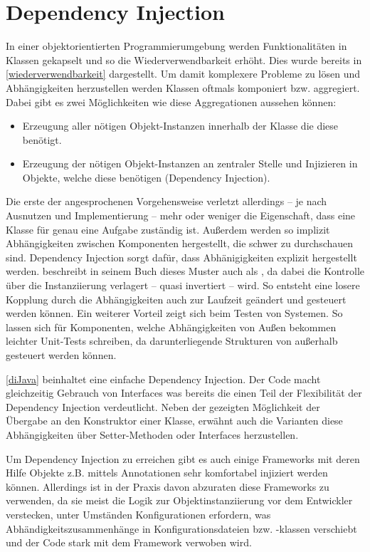 \section{Dependency Injection}
In einer objektorientierten Programmierumgebung werden Funktionalitäten in Klassen gekapselt und so die Wiederverwendbarkeit erhöht. Dies wurde bereits in \autoref{wiederverwendbarkeit} dargestellt. Um damit komplexere Probleme zu lösen und Abhängigkeiten herzustellen werden Klassen oftmals komponiert bzw. aggregiert. Dabei gibt es zwei Möglichkeiten wie diese Aggregationen aussehen können:

\begin{itemize}
    \item Erzeugung aller nötigen Objekt-Instanzen innerhalb der Klasse die diese benötigt.
    \item Erzeugung der nötigen Objekt-Instanzen an zentraler Stelle und Injizieren in Objekte, welche diese benötigen (Dependency Injection). 
\end{itemize}

Die erste der angesprochenen Vorgehensweise verletzt allerdings -- je nach Ausnutzen und Implementierung -- mehr oder weniger die Eigenschaft, dass eine Klasse für genau eine Aufgabe zuständig ist. Außerdem werden so implizit Abhängigkeiten zwischen Komponenten hergestellt, die schwer zu durchschauen sind. Dependency Injection sorgt dafür, dass Abhänigigkeiten explizit hergestellt werden. \citeauthor{martin_clean_2008} beschreibt in seinem Buch  dieses Muster auch als , da dabei die Kontrolle über die Instanziierung verlagert -- quasi invertiert -- wird. So entsteht eine losere Kopplung durch die Abhängigkeiten auch zur Laufzeit geändert und gesteuert werden können. Ein weiterer Vorteil zeigt sich beim Testen von Systemen. So lassen sich für Komponenten, welche Abhängigkeiten von Außen bekommen leichter Unit-Tests schreiben, da darunterliegende Strukturen von außerhalb gesteuert werden können.


\autoref{diJava} beinhaltet eine einfache Dependency Injection. Der Code macht gleichzeitig Gebrauch von Interfaces was bereits die einen Teil der Flexibilität der Dependency Injection verdeutlicht. Neben der gezeigten Möglichkeit der Übergabe an den Konstruktor einer Klasse, erwähnt \citeauthor{martin_clean_2008} \cite{martin_clean_2008} auch die Varianten diese Abhängigkeiten über Setter-Methoden oder Interfaces herzustellen.

Um Dependency Injection zu erreichen gibt es auch einige Frameworks mit deren Hilfe Objekte z.B. mittels Annotationen sehr komfortabel injiziert werden können. Allerdings ist in der Praxis davon abzuraten diese Frameworks zu verwenden, da sie meist die Logik zur Objektinstanziierung vor dem Entwickler verstecken, unter Umständen Konfigurationen erfordern, was Abhändigkeitszusammenhänge in Konfigurationsdateien bzw. -klassen verschiebt und der Code stark mit dem Framework verwoben wird. 